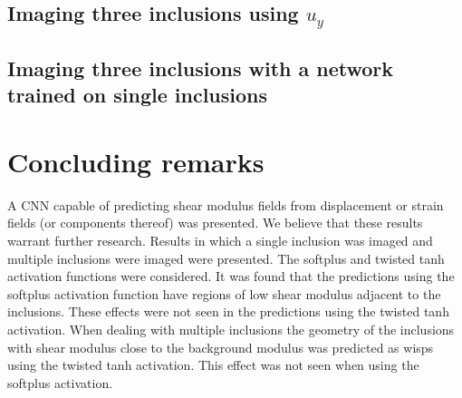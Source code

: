 \documentclass[12pt]{article}
\begin{document}
\subsection{Imaging three inclusions using $u_y$}
\subsection{\label{sect:3with1}Imaging three inclusions with a network trained on single inclusions}
%
\section{Concluding remarks}
A CNN capable of predicting shear modulus fields from displacement or strain fields (or components thereof) was presented. We believe that these results warrant further research. Results in which a single inclusion was imaged and multiple inclusions were imaged were presented. The softplus and twisted tanh activation functions were considered. It was found that the predictions using the softplus activation function have regions of low shear modulus adjacent to the inclusions. These effects were not seen in the predictions using the twisted tanh activation. When dealing with multiple inclusions the geometry of the inclusions with shear modulus close to the background modulus was predicted as wisps using the twisted tanh activation. This effect was not seen when using the softplus activation.    
\end{document}
